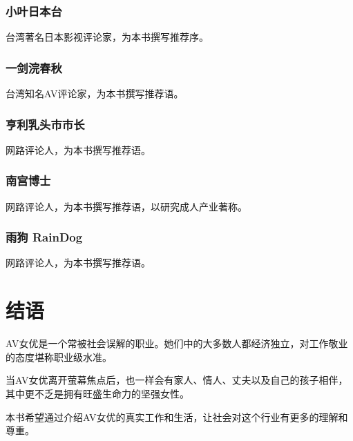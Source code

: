 \documentclass[12pt,UTF8]{ctexbook}
\begin{document}
\subsection{小叶日本台}

台湾著名日本影视评论家，为本书撰写推荐序。

\subsection{一剑浣春秋}

台湾知名AV评论家，为本书撰写推荐语。

\subsection{亨利乳头市市长}

网路评论人，为本书撰写推荐语。

\subsection{南宫博士}

网路评论人，为本书撰写推荐语，以研究成人产业著称。

\subsection{雨狗 RainDog}

网路评论人，为本书撰写推荐语。

\backmatter

\chapter{结语}

AV女优是一个常被社会误解的职业。她们中的大多数人都经济独立，对工作敬业的态度堪称职业级水准。

当AV女优离开萤幕焦点后，也一样会有家人、情人、丈夫以及自己的孩子相伴，其中更不乏是拥有旺盛生命力的坚强女性。

本书希望通过介绍AV女优的真实工作和生活，让社会对这个行业有更多的理解和尊重。
\end{document}
